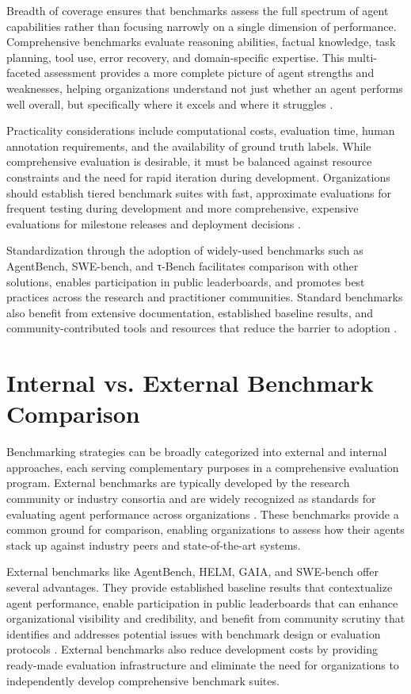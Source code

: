 \begin{TNtwocol}
Breadth of coverage ensures that benchmarks assess the full spectrum of agent capabilities rather than focusing narrowly on a single dimension of performance. Comprehensive benchmarks evaluate reasoning abilities, factual knowledge, task planning, tool use, error recovery, and domain-specific expertise. This multi-faceted assessment provides a more complete picture of agent strengths and weaknesses, helping organizations understand not just whether an agent performs well overall, but specifically where it excels and where it struggles \cite{liu2023,liang2023,liu2023}.

Practicality considerations include computational costs, evaluation time, human annotation requirements, and the availability of ground truth labels. While comprehensive evaluation is desirable, it must be balanced against resource constraints and the need for rapid iteration during development. Organizations should establish tiered benchmark suites with fast, approximate evaluations for frequent testing during development and more comprehensive, expensive evaluations for milestone releases and deployment decisions \cite{kiela2021,googlecloud2024}.

Standardization through the adoption of widely-used benchmarks such as AgentBench, SWE-bench, and τ-Bench facilitates comparison with other solutions, enables participation in public leaderboards, and promotes best practices across the research and practitioner communities. Standard benchmarks also benefit from extensive documentation, established baseline results, and community-contributed tools and resources that reduce the barrier to adoption \cite{liu2023,jimenez2024,putta2024}.

\section{Internal vs. External Benchmark Comparison}
Benchmarking strategies can be broadly categorized into external and internal approaches, each serving complementary purposes in a comprehensive evaluation program. External benchmarks are typically developed by the research community or industry consortia and are widely recognized as standards for evaluating agent performance across organizations \cite{liu2023,liang2023,mialon2023}. These benchmarks provide a common ground for comparison, enabling organizations to assess how their agents stack up against industry peers and state-of-the-art systems.

External benchmarks like AgentBench, HELM, GAIA, and SWE-bench offer several advantages. They provide established baseline results that contextualize agent performance, enable participation in public leaderboards that can enhance organizational visibility and credibility, and benefit from community scrutiny that identifies and addresses potential issues with benchmark design or evaluation protocols \cite{liu2023,liang2023,jimenez2024}. External benchmarks also reduce development costs by providing ready-made evaluation infrastructure and eliminate the need for organizations to independently develop comprehensive benchmark suites.


\end{TNtwocol}
